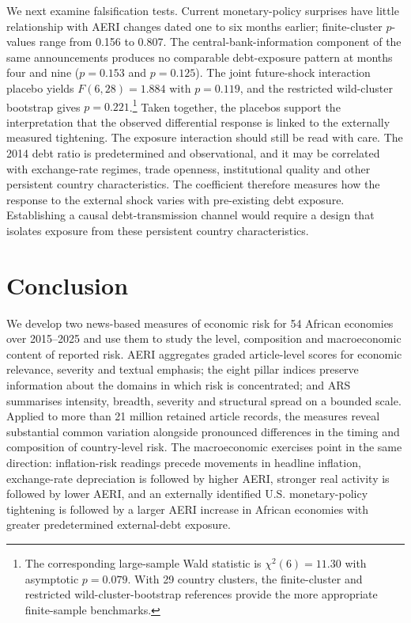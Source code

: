 \documentclass[12pt]{article}
\begin{document}
We next examine falsification tests. Current monetary-policy surprises have little relationship with AERI changes dated one to six months earlier; finite-cluster $p$-values range from 0.156 to 0.807. The central-bank-information component of the same announcements produces no comparable debt-exposure pattern at months four and nine ($p=0.153$ and $p=0.125$). The joint future-shock interaction placebo yields $F(6,28)=1.884$ with $p=0.119$, and the restricted wild-cluster bootstrap gives $p=0.221$.\footnote{The corresponding large-sample Wald statistic is $\chi^2(6)=11.30$ with asymptotic $p=0.079$. With 29 country clusters, the finite-cluster and restricted wild-cluster-bootstrap references provide the more appropriate finite-sample benchmarks.} Taken together, the placebos support the interpretation that the observed differential response is linked to the externally measured tightening. The exposure interaction should still be read with care. The 2014 debt ratio is predetermined and observational, and it may be correlated with exchange-rate regimes, trade openness, institutional quality and other persistent country characteristics. The coefficient therefore measures how the response to the external shock varies with pre-existing debt exposure. Establishing a causal debt-transmission channel would require a design that isolates exposure from these persistent country characteristics.

\FloatBarrier

\section{Conclusion}\label{sec:summary}
We develop two news-based measures of economic risk for 54 African economies over 2015--2025 and use them to study the level, composition and macroeconomic content of reported risk. AERI aggregates graded article-level scores for economic relevance, severity and textual emphasis; the eight pillar indices preserve information about the domains in which risk is concentrated; and ARS summarises intensity, breadth, severity and structural spread on a bounded scale. Applied to more than 21 million retained article records, the measures reveal substantial common variation alongside pronounced differences in the timing and composition of country-level risk. The macroeconomic exercises point in the same direction: inflation-risk readings precede movements in headline inflation, exchange-rate depreciation is followed by higher AERI, stronger real activity is followed by lower AERI, and an externally identified U.S. monetary-policy tightening is followed by a larger AERI increase in African economies with greater predetermined external-debt exposure.
\end{document}
